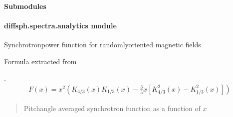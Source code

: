\documentclass[letterpaper,10pt,english]{sphinxmanual}
\begin{document}
\paragraph{Submodules}
\label{\detokenize{diffsph.spectra:submodules}}

\paragraph{diffsph.spectra.analytics module}
\label{\detokenize{diffsph.spectra:module-diffsph.spectra.analytics}}\label{\detokenize{diffsph.spectra:diffsph-spectra-analytics-module}}

\begin{fulllineitems}
\label{\detokenize{diffsph.spectra:diffsph.spectra.analytics.Fav}}
\pysigstartsignatures
{}
\pysigstopsignatures
\sphinxAtStartPar
Synchrotron\sphinxhyphen{}power function for randomly\sphinxhyphen{}oriented magnetic fields %
\begin{footnote}\sphinxAtStartFootnote
Formula extracted from 
%
\end{footnote}.
\begin{equation*}
\begin{split}F(x) = x^2 \left(K_{4/3}(x) K_{1/3}(x) - \frac35 x [K_{4/3}^2(x) - K_{1/3}^2(x)]\right)\end{split}
\end{equation*}\begin{quote}\begin{description}
\sphinxAtStartPar
Pitch\sphinxhyphen{}angle averaged synchrotron function as a function of \(x\)

\end{description}\end{quote}

\end{fulllineitems}

\end{document}
